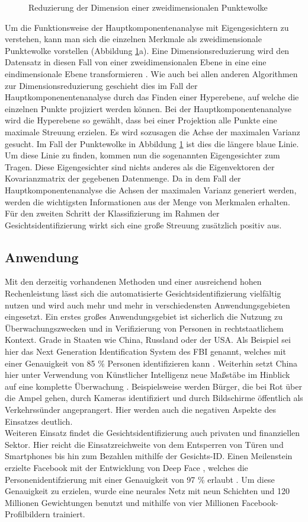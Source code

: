 \documentclass[doktyp=semarbeit, sprache=german]{TUBAFarbeiten}
\begin{document}
\begin{figure}
\begin{subfigure}[c]{0.49\textwidth}
\end{subfigure}
\caption{Reduzierung der Dimension einer zweidimensionalen Punktewolke }
\label{img:PCA}
\end{figure}Um die Funktionsweise der Hauptkomponentenanalyse mit Eigengesichtern zu verstehen, kann man sich die einzelnen Merkmale als zweidimensionale Punktewolke vorstellen (Abbildung \ref{img:PCA}a). Eine Dimensionsreduzierung wird den Datensatz in diesen Fall von einer zweidimensionalen Ebene in eine eine eindimensionale Ebene transformieren \cite{PCAPython}. Wie auch bei allen anderen Algorithmen zur Dimensionsreduzierung geschieht dies im Fall der Hauptkomponenentenanalyse durch das Finden einer Hyperebene, auf welche die einzelnen Punkte projiziert werden können. Bei der Hauptkomponentenanalyse wird die Hyperebene so gewählt, dass bei einer Projektion alle Punkte eine maximale Streuung erzielen. Es wird sozusagen die Achse der maximalen Varianz gesucht. Im Fall der Punktewolke in Abbildung \ref{img:PCA} ist dies die längere blaue Linie. Um diese Linie zu finden, kommen nun die sogenannten Eigengesichter zum Tragen. Diese Eigengesichter sind nichts anderes als die Eigenvektoren der Kovarianzmatrix der gegebenen Datenmenge. Da in dem Fall der Hauptkomponentenanalyse die Achsen der maximalen Varianz generiert werden, werden die wichtigsten Informationen aus der Menge von Merkmalen erhalten. Für den zweiten Schritt der Klassifizierung im Rahmen der Gesichtsidentifizierung wirkt sich eine große Streuung zusätzlich positiv aus.
\subsection{Anwendung}
Mit den derzeitig vorhandenen Methoden und einer ausreichend hohen Rechenleistung lässt sich die automatisierte Gesichtsidentifizierung vielfältig nutzen und wird auch mehr und mehr in verschiedensten Anwendungsgebieten eingesetzt. Ein erstes großes Anwendungsgebiet ist sicherlich die Nutzung zu Überwachungszwecken und in Verifizierung von Personen in rechtstaatlichem Kontext. Grade in Staaten wie China, Russland oder der USA. Als Beispiel sei hier das \glqq Next Generation Identification System\grqq{} des FBI genannt, welches mit einer Genauigkeit von 85 \% Personen identifizieren kann \cite{FBI}. Weiterhin setzt China hier unter Verwendung von Künstlicher Intelligenz neue Maßstäbe im Hinblick auf eine komplette Überwachung \cite{China}. Beispielsweise werden Bürger, die bei Rot über die Ampel gehen, durch Kameras identifiziert und durch Bildschirme öffentlich als Verkehrssünder angeprangert. Hier werden auch die negativen Aspekte des Einsatzes deutlich.
\\Weiteren Einsatz findet die Gesichtsidentifizierung auch privaten und finanziellen Sektor. Hier reicht die Einsatzreichweite von dem Entsperren von Türen und Smartphones bis hin zum Bezahlen mithilfe der Gesichts-ID.
Einen Meilenstein erzielte Facebook mit der Entwicklung von \glqq Deep Face \grqq{}, welches die Personenidentifzierung mit einer Genauigkeit von 97 \% erlaubt \cite{DeepFace}. Um diese Genauigkeit zu erzielen, wurde eine neurales Netz mit neun Schichten und 120 Millionen Gewichtungen benutzt und mithilfe von vier Millionen Facebook-Profilbildern trainiert.
\end{document}
